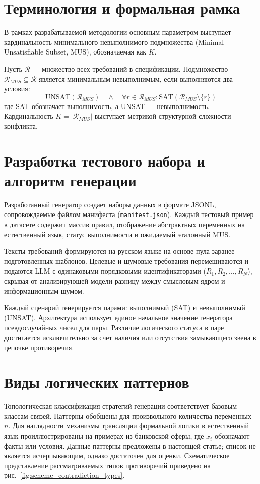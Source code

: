 \section{Терминология и формальная рамка}
В рамках разрабатываемой методологии основным параметром выступает кардинальность минимального невыполнимого подмножества (Minimal Unsatisfiable Subset, MUS), обозначаемая как $K$. 

Пусть $\mathcal{R}$ — множество всех требований в спецификации. Подмножество $\mathcal{R}_{MUS} \subseteq \mathcal{R}$ является минимальным невыполнимым, если выполняются два условия:
\begin{equation} \label{eq:mus_def}
    \text{UNSAT}(\mathcal{R}_{MUS}) \quad \land \quad \forall r \in \mathcal{R}_{MUS} : \text{SAT}(\mathcal{R}_{MUS} \setminus \{r\})
\end{equation}
где SAT обозначает выполнимость, а UNSAT — невыполнимость. Кардинальность $K = \vert \mathcal{R}_{MUS} \vert$ выступает метрикой структурной сложности конфликта.

\section{Разработка тестового набора и алгоритм генерации}
Разработанный генератор создает наборы данных в формате JSONL, сопровождаемые файлом манифеста (\texttt{manifest.json}). Каждый тестовый пример в датасете содержит массив правил, отображение абстрактных переменных на естественный язык, статус выполнимости и ожидаемый эталонный MUS. 

Тексты требований формируются на русском языке на основе пула заранее подготовленных шаблонов. Целевые и шумовые требования перемешиваются и подаются LLM с одинаковыми порядковыми идентификаторами ($R_1, R_2, \dots, R_N$), скрывая от анализирующей модели разницу между смысловым ядром и информационным шумом.

Каждый сценарий генерируется парами: выполнимый (SAT) и невыполнимый (UNSAT). Архитектура использует единое начальное значение генератора псевдослучайных чисел для пары. Различие логического статуса в паре достигается исключительно за счет наличия или отсутствия замыкающего звена в цепочке противоречия.

\section{Виды логических паттернов}
Топологическая классификация стратегий генерации соответствует базовым классам связей. Паттерны обобщены для произвольного количества переменных $n$. Для наглядности механизмы трансляции формальной логики в естественный язык проиллюстрированы на примерах из банковской сферы, где $x_i$ обозначают факты или условия. Данные паттерны предложены в настоящей статье; список не является исчерпывающим, однако достаточен для оценки. Схематическое представление рассматриваемых типов противоречий приведено на рис.~\ref{fig:scheme_contradiction_types}.

